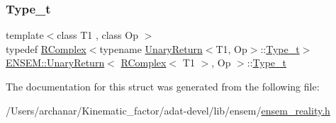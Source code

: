 \subsubsection{\texorpdfstring{Type\_t}{Type\_t}\hspace{0.1cm}{\footnotesize\ttfamily [3/3]}}
{\footnotesize\ttfamily template$<$class T1 , class Op $>$ \\
typedef \mbox{\hyperlink{classENSEM_1_1RComplex}{R\+Complex}}$<$typename \mbox{\hyperlink{structENSEM_1_1UnaryReturn}{Unary\+Return}}$<$T1, Op$>$\+::\mbox{\hyperlink{structENSEM_1_1UnaryReturn_3_01RComplex_3_01T1_01_4_00_01Op_01_4_ac02d831030bfab6627f041d352dbbe95}{Type\+\_\+t}}$>$ \mbox{\hyperlink{structENSEM_1_1UnaryReturn}{E\+N\+S\+E\+M\+::\+Unary\+Return}}$<$ \mbox{\hyperlink{classENSEM_1_1RComplex}{R\+Complex}}$<$ T1 $>$, Op $>$\+::\mbox{\hyperlink{structENSEM_1_1UnaryReturn_3_01RComplex_3_01T1_01_4_00_01Op_01_4_ac02d831030bfab6627f041d352dbbe95}{Type\+\_\+t}}}



The documentation for this struct was generated from the following file\+:\begin{DoxyCompactItemize}
\item 
/\+Users/archanar/\+Kinematic\+\_\+factor/adat-\/devel/lib/ensem/\mbox{\hyperlink{adat-devel_2lib_2ensem_2ensem__reality_8h}{ensem\+\_\+reality.\+h}}\end{DoxyCompactItemize}
